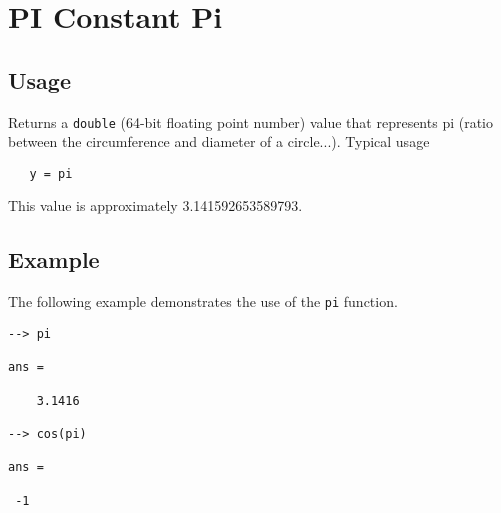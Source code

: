 \section{PI Constant Pi}

\subsection{Usage}

Returns a \verb|double| (64-bit floating point number) value that represents pi (ratio between the circumference and diameter of a circle...).  Typical usage 
\begin{verbatim}
   y = pi
\end{verbatim}
This value is approximately 3.141592653589793.
\subsection{Example}

The following example demonstrates the use of the \verb|pi| function.
\begin{verbatim}
--> pi

ans = 

    3.1416 

--> cos(pi)

ans = 

 -1 
\end{verbatim}
